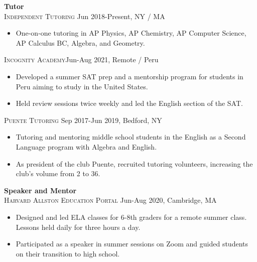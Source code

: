 \documentclass[11pt]{article}
\begin{document}
   \noindent\textbf{Tutor} \\
   \textsc{Independent Tutoring} \hfill Jun 2018-Present, NY / MA
   \begin{itemize}[itemsep=-.4em, leftmargin=1em]\vspace{-2mm}
    \item One-on-one tutoring in AP Physics, AP Chemistry, AP Computer Science, AP Calculus BC, Algebra, and Geometry.
   \end{itemize}\vspace{-1mm}
   \textsc{Incognity Academy}\hfill Jun-Aug 2021, Remote / Peru
   \begin{itemize}[itemsep=-.4em, leftmargin=1em]\vspace{-2mm}
     \item Developed a summer SAT prep and a mentorship program for students in Peru aiming to study in the United States. 
     \item Held review sessions twice weekly and led the English section of the SAT.
   \end{itemize}\vspace{-1mm}
   \textsc{Puente Tutoring} \hfill Sep 2017-Jun 2019, Bedford, NY
   \begin{itemize}[itemsep=-.4em, leftmargin=1em]\vspace{-2mm}
     \item Tutoring and mentoring middle school students in the English as a Second Language program with Algebra and English.
     \item As president of the club Puente, recruited tutoring volunteers, increasing the club's volume from 2 to 36.
   \end{itemize}

   \noindent\textbf{Speaker and Mentor}\\
   \textsc{Harvard Allston Education Portal} \hfill Jun-Aug 2020, Cambridge, MA
   \begin{itemize}[itemsep=-.4em, leftmargin=1em]\vspace{-2mm}
     \item Designed and led ELA classes for 6-8th graders for a remote summer class. Lessons held daily for three hours a day.
     \item Participated as a speaker in summer sessions on Zoom and guided students on their transition to high school.
   \end{itemize} 

  \vspace{-7pt}\\
  \noindent\makebox[\linewidth]{\rule{7.5in}{0.3pt}}
\end{document}
